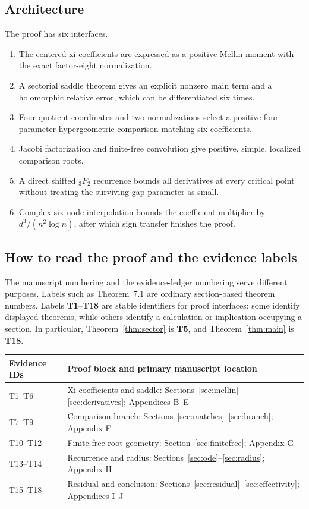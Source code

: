 \documentclass[12pt]{article}
\begin{document}
\subsection{Architecture}

The proof has six interfaces.
\begin{enumerate}
\item The centered xi coefficients are expressed as a positive Mellin moment
with the exact factor-eight normalization.
\item A sectorial saddle theorem gives an explicit nonzero main term and a
holomorphic relative error, which can be differentiated six times.
\item Four quotient coordinates and two normalizations select a positive
four-parameter hypergeometric comparison matching six coefficients.
\item Jacobi factorization and finite-free convolution give positive, simple,
localized comparison roots.
\item A direct shifted ${}_3F_2$ recurrence bounds all derivatives at every
critical point without treating the surviving gap parameter as small.
\item Complex six-node interpolation bounds the coefficient multiplier by
$d^3/(n^2\log n)$, after which sign transfer finishes the proof.
\end{enumerate}

\subsection{How to read the proof and the evidence labels}

The manuscript numbering and the evidence-ledger numbering serve different
purposes.  Labels such as Theorem~7.1 are ordinary section-based theorem
numbers.  Labels \textbf{T1}--\textbf{T18} are stable identifiers for proof
interfaces: some identify displayed theorems, while others identify a
calculation or implication occupying a section.  In particular,
Theorem~\ref{thm:sector} is \textbf{T5}, and
Theorem~\ref{thm:main} is \textbf{T18}.

\begin{center}
\begin{tabular}{@{}lp{}@{}}
\toprule
Evidence IDs & Proof block and primary manuscript location \\
\midrule
T1--T6 & Xi coefficients and saddle: Sections~\ref{sec:mellin}--\ref{sec:derivatives}; Appendices B--E \\
T7--T9 & Comparison branch: Sections~\ref{sec:matches}--\ref{sec:branch}; Appendix F \\
T10--T12 & Finite-free root geometry: Section~\ref{sec:finitefree}; Appendix G \\
T13--T14 & Recurrence and radius: Sections~\ref{sec:ode}--\ref{sec:radius}; Appendix H \\
T15--T18 & Residual and conclusion: Sections~\ref{sec:residual}--\ref{sec:effectivity}; Appendices I--J \\
\bottomrule
\end{tabular}
\end{center}
\end{document}
